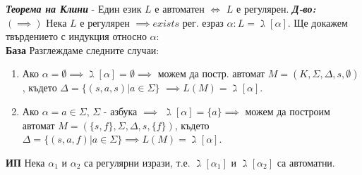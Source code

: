 \documentclass[fleqn,12pt]{article}
\begin{document}
\begin{flushleft}
\textit{\textbf{Теорема на Клини}} - Един език $L$ е автоматен $\iff$ $L$ е регулярен.
\textit{\textbf{Д-во:}}\\
$(\implies)$ Нека $L$ е регулярен $\implies exists$ рег. езраз $\alpha: L = \gimel[\alpha]$. Ще докажем твърдението с индукция относно $\alpha$: \\
\textbf{База} Разглеждаме следните случаи:
\begin{enumerate}
    \item Ако $\alpha = \emptyset \implies \gimel[\alpha] = \emptyset \implies$ можем да постр. автомат $M = (K, \Sigma, \Delta, s, \emptyset)$, където $\Delta = \{(s, a, s) | a \in \Sigma\}$ $\implies L(M) = \gimel[\alpha]$. \\
    \item Ако $\alpha = a \in \Sigma$, $\Sigma$ - азбука $\implies$ $\gimel[\alpha] = \{a\} \implies$ можем да построим автомат $M = (\{s, f\}, \Sigma, \Delta, s, \{f\})$, където $\Delta = \{(s, a, f) | a \in \Sigma\} \implies L(M) = \gimel[\alpha]$.\\
\end{enumerate}

\textbf{ИП} Нека $\alpha_1$ и $\alpha_2$ са регулярни изрази, т.е. $\gimel[\alpha_1]$ и $\gimel[\alpha_2]$ са автоматни.


\end{flushleft}
\end{document}
